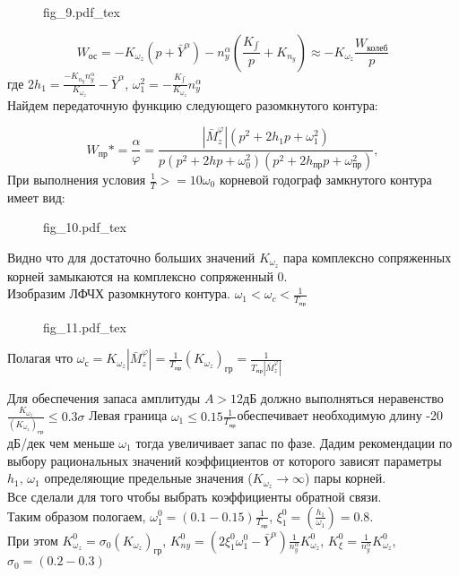 \documentclass{article}
\begin{document}
\begin{figure}[H]
	\begin{minipage}{\textwidth}
		\centering
		{fig_9.pdf_tex}
	\end{minipage}
\end{figure}


\[
	W_\text{ос} = -K_{\omega_z} (p+\bar{Y}^\alpha) - n_y^\alpha (\frac{K_{\int}}{p} + K_{n_y})
	\approx -K_{\omega_z}\frac{W_\text{колеб}}{p}
\]
где $2h_1 = \frac{-K_{n_y} n_y^\alpha}{K_{\omega_z}} - \bar{Y}^\alpha$, $\omega_1^2 = -\frac{K_{\int}} {K_{\omega_z}} n_y^\alpha $\\
Найдем передаточную функцию следующего разомкнутого контура:

\[
	W_\text{пр}* = {\frac{\alpha}{\varphi}} = \frac{|\bar{M}_z^\varphi| (p^2 + 2h_1 p + \omega_1^2)} {p(p^2 + 2 hp + \omega_0^2) (p^2 + 2h_\text{пр}p + \omega_\text{пр}^2)},
\]
При выполнения условия $\frac{1}{T} >= 10 \omega_0$ корневой годограф замкнутого контура имеет вид:
\begin{figure}[H]
	\centering
	{fig_10.pdf_tex}
\end{figure}
Видно что для достаточно больших значений $K_{\omega_z}$ пара комплексно сопряженных корней замыкаются на комплексно сопряженный 0.\\
Изобразим ЛФЧХ разомкнутого контура.
$\omega_1 < \omega_c < \frac{1}{T_\text{пр}}$

\begin{figure}[H]
	\centering
	{fig_11.pdf_tex}
\end{figure}


Полагая что $\omega_\text{с} = K_{\omega_z} | \bar{M}_z^\varphi| = \frac{1}{T_\text{пр}}
	(K_{\omega_z})_\text{гр} = \frac{1}{T_\text{пр}|\bar{M}_z^\varphi|}$

Для обеспечения запаса амплитуды $A > 12 \text{дБ}$ должно выполняться неравенство $\frac{K_{\omega_z}}{(K_{\omega_z})_\text{гр}} \leq 0.3 \sigma $
Левая граница $\omega_1 \leq 0.15 \frac{1}{T_\text{пр}}$обеспечивает необходимую длину -20 дБ/дек чем меньше $\omega_1$ тогда увеличивает запас по фазе.
Дадим рекомендации по выбору рациональных значений коэффициентов от которого зависят параметры $h_1, \, \omega_1$ определяющие предельные значения ($K_{\omega_z} \rightarrow\infty$) пары корней.\\
Все сделали для того чтобы выбрать коэффициенты обратной связи. \\ 
Таким образом пологаем, $\omega_1^0 = (0.1 - 0.15) \frac{1}{T_\text{пр}}$, $\xi_1^0 = (\frac{h_1}{\omega_1}) = 0.8$.\\
При этом $K_{\omega_z}^0 = \sigma_0 (K_{\omega_z})_\text{гр}$, $K_{ny}^0 = (2\xi_1^0 \omega_1^0 - \bar{Y}^\alpha) \frac{1}{n_y^\alpha} K_{\omega_z}^0$, $K_{\xi}^0 = \frac{1}{n_y^\alpha} K_{\omega_z}^0$, $\sigma_0 = (0.2 - 0.3)$
\newpage
\end{document}
